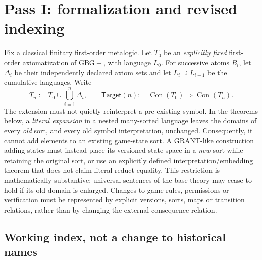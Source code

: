 \documentclass[11pt,letterpaper]{article}
\theoremstyle{definition}
\newcommand{\Con}{\operatorname{Con}}
\newcommand{\Gb}{\mathrm{GBG+}}
\begin{document}
\section{Pass I: formalization and revised indexing}

Fix a classical finitary first-order metalogic. Let \(T_0\) be an \emph{explicitly fixed} first-order axiomatization of \(\Gb\), with language \(L_0\). For successive atoms \(B_i\), let \(\Delta_i\) be their independently declared axiom sets and let \(L_i\supseteq L_{i-1}\) be the cumulative languages. Write
\begin{equation}\label{eq:prefix}
T_n := T_0\cup\bigcup_{i=1}^{n}\Delta_i, \qquad
\mathsf{Target}(n):\quad \Con(T_0)\Longrightarrow\Con(T_n).
\end{equation}
The extension must not quietly reinterpret a pre-existing symbol. In the theorems below, a \emph{literal expansion} in a nested many-sorted language leaves the domains of every \emph{old} sort, and every old symbol interpretation, unchanged. Consequently, it cannot add elements to an existing game-state sort. A GRANT-like construction adding states must instead place its versioned state space in a \emph{new} sort while retaining the original sort, or use an explicitly defined interpretation/embedding theorem that does not claim literal reduct equality. This restriction is mathematically substantive: universal sentences of the base theory may cease to hold if its old domain is enlarged. Changes to game rules, permissions or verification must be represented by explicit versions, sorts, maps or transition relations, rather than by changing the external consequence relation.

\subsection{Working index, not a change to historical names}
\end{document}
